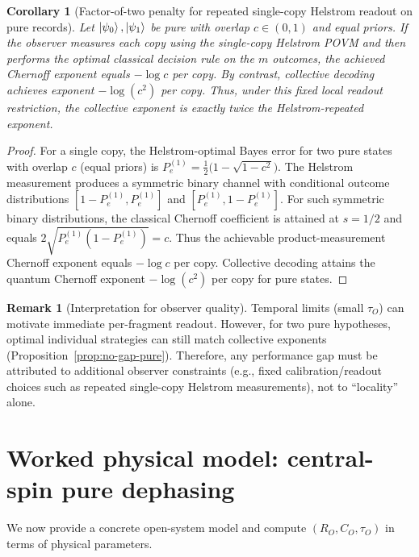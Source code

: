 \documentclass[11pt]{article}
\newcommand{\1}{\mathbf{1}}
\theoremstyle{definition}
\newtheorem{remark}{Remark}
\theoremstyle{plain}
\newtheorem{corollary}{Corollary}
\begin{document}
\begin{corollary}[Factor-of-two penalty for repeated single-copy Helstrom readout on pure records]
\label{cor:helstrom-penalty}
\label{cor:factor-two-gap}
Let $\ket{\psi_0},\ket{\psi_1}$ be pure with overlap $c\in(0,1)$ and equal priors.
If the observer measures each copy using the single-copy Helstrom POVM and then performs the optimal classical decision rule on the $m$ outcomes, the achieved Chernoff exponent equals $-\log c$ per copy.
By contrast, collective decoding achieves exponent $-\log(c^2)$ per copy.
Thus, under this \emph{fixed local readout restriction}, the collective exponent is exactly twice the Helstrom-repeated exponent.
\end{corollary}

\begin{proof}
For a single copy, the Helstrom-optimal Bayes error for two pure states with overlap $c$ (equal priors) is
$P_e^{(1)}=\tfrac12\bigl(1-\sqrt{1-c^2}\bigr)$.
The Helstrom measurement produces a symmetric binary channel with conditional outcome distributions
$[1-P_e^{(1)},P_e^{(1)}]$ and $[P_e^{(1)},1-P_e^{(1)}]$.
For such symmetric binary distributions, the classical Chernoff coefficient is attained at $s=1/2$ and equals
$2\sqrt{P_e^{(1)}(1-P_e^{(1)})}=c$.
Thus the achievable product-measurement Chernoff exponent equals $-\log c$ per copy.
Collective decoding attains the quantum Chernoff exponent $-\log(c^2)$ per copy for pure states.
\end{proof}

\begin{remark}[Interpretation for observer quality]
Temporal limits (small $\tau_O$) can motivate immediate per-fragment readout.
However, for two pure hypotheses, optimal individual strategies can still match collective exponents (Proposition~\ref{prop:no-gap-pure}).
Therefore, any performance gap must be attributed to additional observer constraints (e.g., fixed calibration/readout choices such as repeated single-copy Helstrom measurements), not to ``locality'' alone.
\end{remark}

\section{Worked physical model: central-spin pure dephasing}
\label{sec:centralspin}

We now provide a concrete open-system model and compute $(R_O,C_O,\tau_O)$ in terms of physical parameters.
\end{document}
